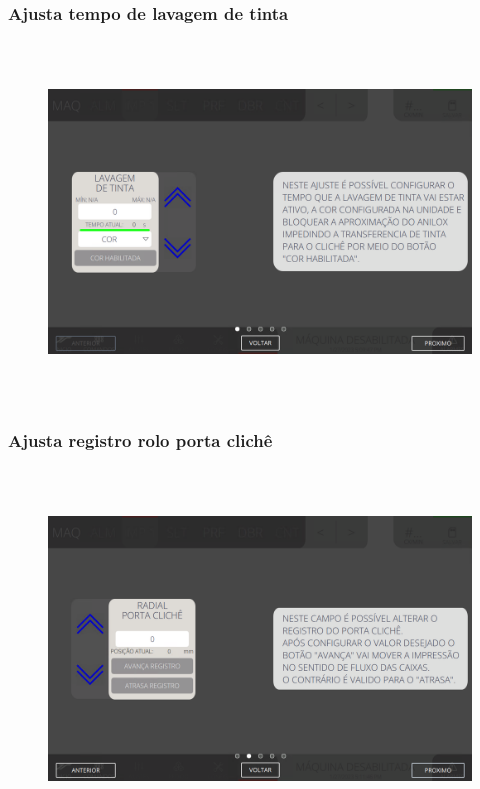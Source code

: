 \subsubsection{\small{Ajusta tempo de lavagem de tinta}}\label{ajustaTempoLavagemTinta}
\vspace*{\fill}
\begin{figure}[h]
  \centering
  \includegraphics[width=576px,height=360px]{src/imagesFlexo/04-printter/02-printter/settings/e-1.png}
\end{figure}
\vspace*{\fill}

\newpage
\thispagestyle{fancy}
\vspace*{40 pt}
\subsubsection{\small{Ajusta registro rolo porta clichê}}\label{ajustaRegistroRoloPortaCliche}
\vspace*{\fill}
\begin{figure}[h]
  \centering
  \includegraphics[width=576px,height=360px]{src/imagesFlexo/04-printter/02-printter/settings/e-2.png}
\end{figure}
\vspace*{\fill}

